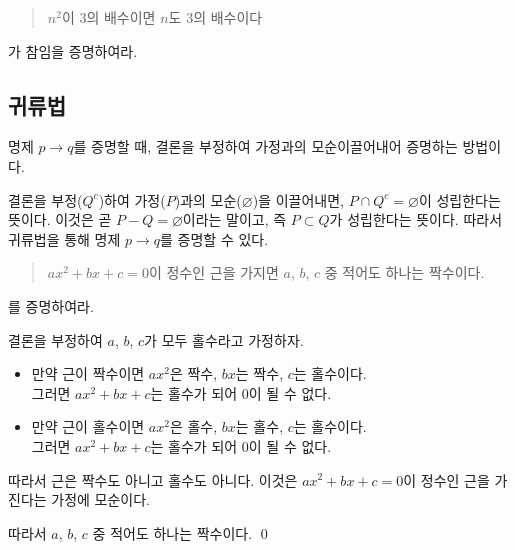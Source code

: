 \documentclass{oblivoir}
\begin{document}
%
\begin{quote}\label{proof5}
\(n^2\)이 \(3\)의 배수이면 \(n\)도 \(3\)의 배수이다
\end{quote}
가 참임을 증명하여라.
\bigskip\bigskip\bigskip
\newpage

%
\subsection{귀류법}
명제 \(p\to q\)를 증명할 때, 결론을 부정하여 가정과의 모순 이끌어내어 증명하는 방법이다.


결론을 부정(\(Q^c\))하여 가정(\(P\))과의 모순(\(\varnothing\))을 이끌어내면, \(P\cap Q^c=\varnothing\)이 성립한다는 뜻이다.
이것은 곧 \(P-Q=\varnothing\)이라는 말이고, 즉 \(P\subset Q\)가 성립한다는 뜻이다.
따라서 귀류법을 통해 명제 \(p\to q\)를 증명할 수 있다.

%
\begin{quote}\label{proof6}
\(ax^2+bx+c=0\)이 정수인 근을 가지면 \(a\), \(b\), \(c\) 중 적어도 하나는 짝수이다.
\end{quote}
를 증명하여라.
\begin{mdframed}
결론을 부정하여 \(a\), \(b\), \(c\)가 모두 홀수라고 가정하자.
\begin{itemize}
\item
만약 근이 짝수이면 \(ax^2\)은 짝수, \(bx\)는 짝수, \(c\)는 홀수이다.\\
그러면 \(ax^2+bx+c\)는 홀수가 되어 \(0\)이 될 수 없다.
\item
만약 근이 홀수이면 \(ax^2\)은 홀수, \(bx\)는 홀수, \(c\)는 홀수이다.\\
그러면 \(ax^2+bx+c\)는 홀수가 되어 \(0\)이 될 수 없다.
\end{itemize}
따라서  근은 짝수도 아니고 홀수도 아니다.
이것은 \(ax^2+bx+c=0\)이 정수인 근을 가진다는 가정에 모순이다.

따라서 \(a\), \(b\), \(c\) 중 적어도 하나는 짝수이다.
\qed
\end{mdframed}
\end{document}
